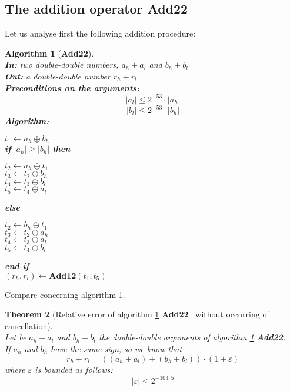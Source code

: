 \documentclass[a4paper,10pt,twoside]{article}
\newtheorem{theorem}{Theorem}[section]
\newtheorem{algorithm}[theorem]{Algorithm}
\newcommand{\hi}{\ensuremath{\mathit{h}}}
\newcommand{\lo}{\ensuremath{\mathit{l}}}
\newcommand{\AddDD}{{\bf Add22}}
\newcommand{\mAdd}{\ensuremath{\mathbf{Add12}}}
\renewcommand{\epsilon}{\varepsilon}
\begin{document}
\subsection{The addition operator \AddDD}
Let us analyse first the following addition procedure:
\begin{algorithm}[\AddDD] \label{addDDref} ~ \\
{\bf In:} two double-double numbers, $a_\hi + a_\lo$ and $b_\hi + b_\lo$ \\
{\bf Out:} a double-double number $r_\hi + r_\lo$ \\
{\bf Preconditions on the arguments:} $$\left \vert a_\lo \right \vert \leq 2^{-53} \cdot \left \vert a_\hi \right \vert$$
                                $$\left \vert b_\lo \right \vert \leq 2^{-53} \cdot \left \vert b_\hi \right \vert$$ 
{\bf Algorithm:} \\
\begin{center}
\begin{minipage}[b]{50mm}
$t_1 \gets a_\hi \oplus b_\hi$ \\
{\bf if} $\left \vert a_\hi \right \vert \geq \left \vert b_\hi \right \vert$ {\bf then} 
\begin{center}
\begin{minipage}[b]{40mm}
$t_2 \gets a_\hi \ominus t_1$ \\
$t_3 \gets t_2 \oplus b_\hi$ \\
$t_4 \gets t_3 \oplus b_\lo$ \\
$t_5 \gets t_4 \oplus a_\lo$ 
\end{minipage}
\end{center}
{\bf else} 
\begin{center}
\begin{minipage}[b]{40mm}
$t_2 \gets b_\hi \ominus t_1$ \\
$t_3 \gets t_2 \oplus a_\hi$ \\
$t_4 \gets t_3 \oplus a_\lo$ \\
$t_5 \gets t_4 \oplus b_\lo$ 
\end{minipage}
\end{center}
{\bf end if} \\
$\left( r_\hi, r_\lo \right) \gets \mAdd\left( t_1, t_5 \right)$
\end{minipage}
\end{center}
\end{algorithm}
Compare \cite{crlibmweb} concerning algorithm \ref{addDDref}.
\begin{theorem}[Relative error of algorithm \ref{addDDref} \AddDD~ without
    occurring of cancellation\label{theoAddDDref}] ~ \\
Let be $a_\hi + a_\lo$ and $b_\hi + b_\lo$ the double-double arguments of algorithm \ref{addDDref} \AddDD.\\
If $a_\hi$ and $b_\hi$ have the same sign, so we know that
$$r_\hi + r_\lo = \left(\left(a_\hi + a_\lo \right) + \left( b_\hi + b_\lo \right)\right) \cdot \left(1 + \epsilon\right)$$
where $\epsilon$ is bounded as follows:
$$\left \vert \epsilon \right \vert \leq 2^{-103,5}$$
\end{theorem}
\end{document}
